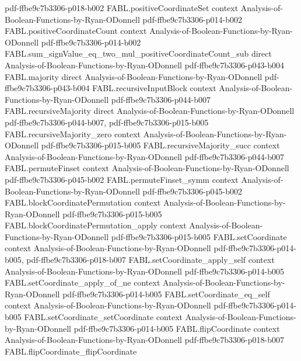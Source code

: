 \begin{theorem}
  {pdf-ffbe9c7b3306-p018-b002}
\proofstep
  {FABL.positiveCoordinateSet}
  {context}
  {Analysis-of-Boolean-Functions-by-Ryan-ODonnell}
  {pdf-ffbe9c7b3306-p014-b002}
\proofstep
  {FABL.positiveCoordinateCount}
  {context}
  {Analysis-of-Boolean-Functions-by-Ryan-ODonnell}
  {pdf-ffbe9c7b3306-p014-b002}
\proofstep
  {FABL.sum_signValue_eq_two_mul_positiveCoordinateCount_sub}
  {direct}
  {Analysis-of-Boolean-Functions-by-Ryan-ODonnell}
  {pdf-ffbe9c7b3306-p043-b004}
\proofstep
  {FABL.majority}
  {direct}
  {Analysis-of-Boolean-Functions-by-Ryan-ODonnell}
  {pdf-ffbe9c7b3306-p043-b004}
\proofstep
  {FABL.recursiveInputBlock}
  {context}
  {Analysis-of-Boolean-Functions-by-Ryan-ODonnell}
  {pdf-ffbe9c7b3306-p044-b007}
\proofstep
  {FABL.recursiveMajority}
  {direct}
  {Analysis-of-Boolean-Functions-by-Ryan-ODonnell}
  {pdf-ffbe9c7b3306-p044-b007,
    pdf-ffbe9c7b3306-p015-b005}
\proofstep
  {FABL.recursiveMajority_zero}
  {context}
  {Analysis-of-Boolean-Functions-by-Ryan-ODonnell}
  {pdf-ffbe9c7b3306-p015-b005}
\proofstep
  {FABL.recursiveMajority_succ}
  {context}
  {Analysis-of-Boolean-Functions-by-Ryan-ODonnell}
  {pdf-ffbe9c7b3306-p044-b007}
\proofstep
  {FABL.permuteFinset}
  {context}
  {Analysis-of-Boolean-Functions-by-Ryan-ODonnell}
  {pdf-ffbe9c7b3306-p045-b002}
\proofstep
  {FABL.permuteFinset_symm}
  {context}
  {Analysis-of-Boolean-Functions-by-Ryan-ODonnell}
  {pdf-ffbe9c7b3306-p045-b002}
\proofstep
  {FABL.blockCoordinatePermutation}
  {context}
  {Analysis-of-Boolean-Functions-by-Ryan-ODonnell}
  {pdf-ffbe9c7b3306-p015-b005}
\proofstep
  {FABL.blockCoordinatePermutation_apply}
  {context}
  {Analysis-of-Boolean-Functions-by-Ryan-ODonnell}
  {pdf-ffbe9c7b3306-p015-b005}
\proofstep
  {FABL.setCoordinate}
  {context}
  {Analysis-of-Boolean-Functions-by-Ryan-ODonnell}
  {pdf-ffbe9c7b3306-p014-b005,
    pdf-ffbe9c7b3306-p018-b007}
\proofstep
  {FABL.setCoordinate_apply_self}
  {context}
  {Analysis-of-Boolean-Functions-by-Ryan-ODonnell}
  {pdf-ffbe9c7b3306-p014-b005}
\proofstep
  {FABL.setCoordinate_apply_of_ne}
  {context}
  {Analysis-of-Boolean-Functions-by-Ryan-ODonnell}
  {pdf-ffbe9c7b3306-p014-b005}
\proofstep
  {FABL.setCoordinate_eq_self}
  {context}
  {Analysis-of-Boolean-Functions-by-Ryan-ODonnell}
  {pdf-ffbe9c7b3306-p014-b005}
\proofstep
  {FABL.setCoordinate_setCoordinate}
  {context}
  {Analysis-of-Boolean-Functions-by-Ryan-ODonnell}
  {pdf-ffbe9c7b3306-p014-b005}
\proofstep
  {FABL.flipCoordinate}
  {context}
  {Analysis-of-Boolean-Functions-by-Ryan-ODonnell}
  {pdf-ffbe9c7b3306-p018-b007}
\proofstep
  {FABL.flipCoordinate_flipCoordinate}

\end{theorem}
